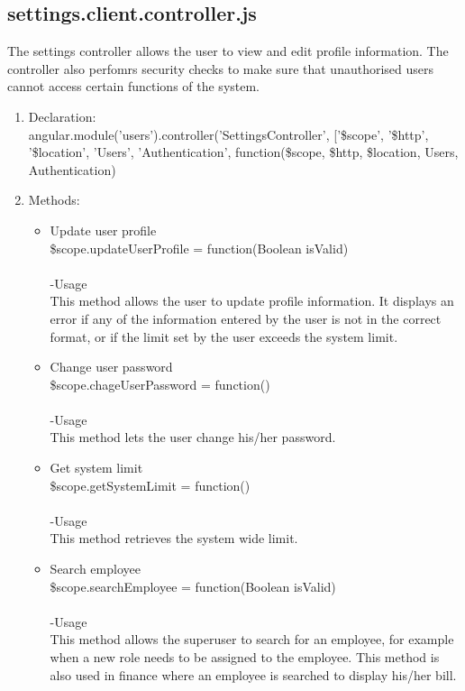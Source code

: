 \documentclass[a4paper,12pt]{article}
\begin{document}
\subsection{settings.client.controller.js}
 The settings controller allows the user to view and edit profile information. The controller also perfomrs security checks to make sure that unauthorised users cannot access certain functions of the system.
 \begin{enumerate}
 \item Declaration:\\angular.module('users').controller('SettingsController', ['\$scope', '\$http', '\$location', 'Users', 'Authentication',
	function(\$scope, \$http, \$location, Users, Authentication) 
	\item Methods:\\
	\begin{itemize}
	\item Update user profile\\ 
 \$scope.updateUserProfile = function(Boolean isValid) \\ \\
 -Usage\\
 This method allows the user to update profile information. It displays an error if any of the information entered by the user is not in the correct format, or if the limit set by the user exceeds the system limit. 
\item Change user password\\
 \$scope.chageUserPassword = function()\\ \\ 
-Usage\\
This method lets the user change his/her password.

\item Get system limit\\
 \$scope.getSystemLimit = function()\\ \\
-Usage\\
This method retrieves the system wide limit.

\item Search employee\\ 
 \$scope.searchEmployee = function(Boolean isValid)\\  \\
-Usage\\
This method allows the superuser to search for an employee, for example when a new role needs to be assigned to the employee.
This method is also used in finance where an employee is searched to display his/her bill. 


\end{itemize}
\end{enumerate}
\end{document}
